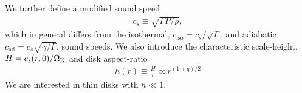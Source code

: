 

We further define a modified sound speed
\begin{align}
	c_s \equiv \sqrt{\Gamma P /\rho } , 
\end{align}
which in general differs from the  isothermal, $c_\mathrm{iso} =
c_s/\sqrt{\Gamma}$, and adiabatic $c_\mathrm{ad} =
c_s\sqrt{\gamma/\Gamma}$, sound speeds. 
We also introduce the characteristic scale-height, $H = c_s(r,0)/\Omega_{\rm K}$
and disk aspect-ratio
\begin{align}
   h(r) \equiv %
  \frac{H}{r} \propto r^{(1+q)/2}
\end{align}
We are interested in thin disks with $ h \ll 1$.


